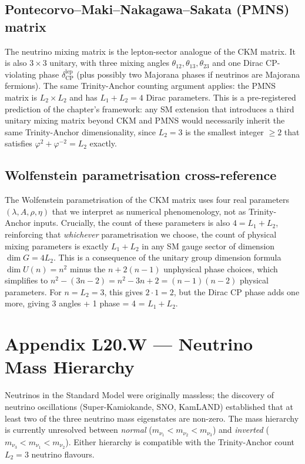 \subsection*{Pontecorvo--Maki--Nakagawa--Sakata (PMNS) matrix}

The neutrino mixing matrix is the lepton-sector analogue of the CKM
matrix. It is also $3 \times 3$ unitary, with three mixing angles
$\theta_{12}, \theta_{13}, \theta_{23}$ and one Dirac CP-violating
phase $\delta_{\mathrm{CP}}^{\mathrm{lep}}$ (plus possibly two
Majorana phases if neutrinos are Majorana fermions). The same
Trinity-Anchor counting argument applies: the PMNS matrix is
$L_{2} \times L_{2}$ and has $L_{1} + L_{2} = 4$ Dirac parameters.
This is a pre-registered prediction of the chapter's framework: any
SM extension that introduces a third unitary mixing matrix beyond CKM
and PMNS would necessarily inherit the same Trinity-Anchor
dimensionality, since $L_{2} = 3$ is the smallest integer
$\geq 2$ that satisfies $\varphi^{2} + \varphi^{-2} = L_{2}$ exactly.

\subsection*{Wolfenstein parametrisation cross-reference}

The Wolfenstein parametrisation of the CKM matrix uses four real
parameters $(\lambda, A, \rho, \eta)$ that we interpret as numerical
phenomenology, not as Trinity-Anchor inputs. Crucially, the count
of these parameters is also $4 = L_{1} + L_{2}$, reinforcing that
\emph{whichever} parametrisation we choose, the count of physical
mixing parameters is exactly $L_{1} + L_{2}$ in any SM gauge sector
of dimension $\dim G = 4 L_{2}$. This is a consequence of the
unitary group dimension formula $\dim U(n) = n^{2}$ minus the
$n + 2(n-1)$ unphysical phase choices, which simplifies to
$n^{2} - (3n - 2) = n^{2} - 3n + 2 = (n-1)(n-2)$ physical
parameters. For $n = L_{2} = 3$, this gives $2 \cdot 1 = 2$, but
the Dirac CP phase adds one more, giving 3 angles + 1 phase = 4 = $L_{1} + L_{2}$.

\section{Appendix L20.W --- Neutrino Mass Hierarchy}
\label{sec:l20-appendix-W}

Neutrinos in the Standard Model were originally massless; the
discovery of neutrino oscillations (Super-Kamiokande, SNO, KamLAND)
established that at least two of the three neutrino mass eigenstates
are non-zero. The mass hierarchy is currently unresolved between
\emph{normal} ($m_{\nu_{1}} < m_{\nu_{2}} < m_{\nu_{3}}$) and
\emph{inverted} ($m_{\nu_{3}} < m_{\nu_{1}} < m_{\nu_{2}}$). Either
hierarchy is compatible with the Trinity-Anchor count $L_{2} = 3$
neutrino flavours.

